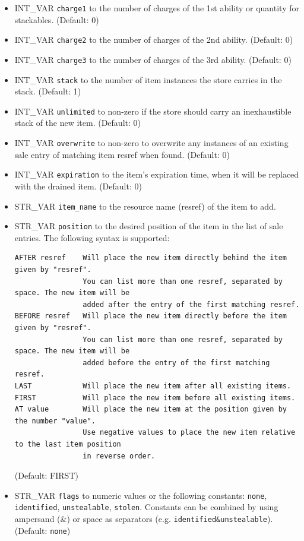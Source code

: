 \documentclass{article}
\begin{document}
\begin{itemize}
\item INT_VAR \verb+charge1+ to the number of charges of the 1st ability or quantity for stackables. (Default: 0)
\item INT_VAR \verb+charge2+ to the number of charges of the 2nd ability. (Default: 0)
\item INT_VAR \verb+charge3+ to the number of charges of the 3rd ability. (Default: 0)
\item INT_VAR \verb+stack+ to the number of item instances the store carries in the stack. (Default: 1)
\item INT_VAR \verb+unlimited+ to non-zero if the store should carry an inexhaustible stack of the new item. (Default: 0)
\item INT_VAR \verb+overwrite+ to non-zero to overwrite any instances of an existing sale entry of matching item resref when found. (Default: 0)
\item INT_VAR \verb+expiration+ to the item's expiration time, when it will be replaced with the drained item. (Default: 0)
\item STR_VAR \verb+item_name+ to the resource name (resref) of the item to add.
\item STR_VAR \verb+position+ to the desired position of the item in the list of sale entries. The following syntax is supported:
\begin{verbatim}
AFTER resref    Will place the new item directly behind the item given by "resref".
                You can list more than one resref, separated by space. The new item will be
                added after the entry of the first matching resref.
BEFORE resref   Will place the new item directly before the item given by "resref".
                You can list more than one resref, separated by space. The new item will be
                added before the entry of the first matching resref.
LAST            Will place the new item after all existing items.
FIRST           Will place the new item before all existing items.
AT value        Will place the new item at the position given by the number "value".
                Use negative values to place the new item relative to the last item position
                in reverse order.
\end{verbatim}
(Default: FIRST)
\item STR_VAR \verb+flags+ to numeric values or the following constants: \verb+none+, \verb+identified+, \verb+unstealable+, \verb+stolen+. Constants can be combined by using ampersand (\&) or space as separators (e.g. \verb+identified&unstealable+). (Default: \verb+none+)

\end{itemize}
\end{document}
